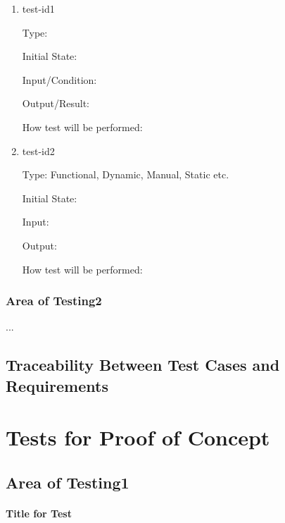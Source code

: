 \documentclass[12pt, titlepage]{article}
\begin{document}
\begin{enumerate}

\item{test-id1\\}

Type: 
					
Initial State: 
					
Input/Condition: 
					
Output/Result: 
					
How test will be performed: 
					
\item{test-id2\\}

Type: Functional, Dynamic, Manual, Static etc.
					
Initial State: 
					
Input: 
					
Output: 
					
How test will be performed: 

\end{enumerate}

\subsubsection{Area of Testing2}

...

\subsection{Traceability Between Test Cases and Requirements}

\section{Tests for Proof of Concept}

\subsection{Area of Testing1}
		
\paragraph{Title for Test}
\end{document}
